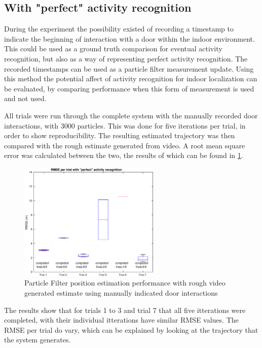 \subsection{With "perfect" activity recognition}
During the experiment the possibility existed of recording a timestamp to indicate the beginning of interaction with a door within the indoor environment. This could be used as a ground truth comparison for eventual activity recognition, but also as a way of representing perfect activity recognition. The recorded timestamps can be used as a particle filter measurement update. Using this method the potential affect of activity recognition for indoor localization can be evaluated, by comparing performance when this form of measurement is used and not used. \par 

All trials were run through the complete system with the manually recorded door interactions, with 3000 particles. This was done for five iterations per trial, in order to show reproducibility.  The resulting estimated trajectory was then compared with the rough estimate generated from video.  A root mean square error was calculated between the two, the results of which can be found in \cref{fig:pf_boxplot}.

\begin{figure}[H]
	\centering
	\includegraphics[width=0.6\textwidth]{images/20201116_1332_RMSE_per_trial_with_perfect_activity_recognition}
	\caption[Particle Filter position estimation performance with door interaction]{Particle Filter position estimation performance with rough video generated estimate using manually indicated door interactions}	
	\label{fig:pf_boxplot}
\end{figure}

The results show that for trials 1 to 3 and trial 7 that all five itterations were completed, with their individual itterations have similar RMSE values. The RMSE per trial do vary, which can be explained by looking at the trajectory that the system generates. \par 


